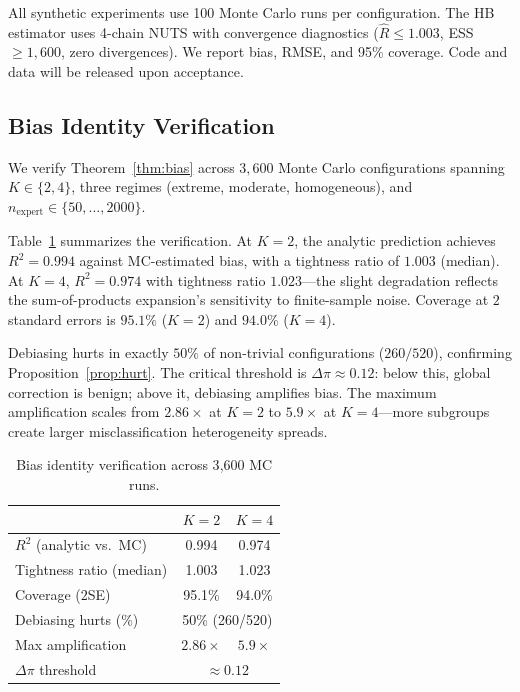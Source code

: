 \documentclass[11pt,twocolumn]{article}
\theoremstyle{remark}
\begin{document}
All synthetic experiments use 100 Monte Carlo runs per configuration.
The HB estimator uses 4-chain NUTS with convergence diagnostics ($\hat{R} \leq 1.003$, ESS $\geq 1{,}600$, zero divergences).
We report bias, RMSE, and 95\% coverage.
Code and data will be released upon acceptance.

\subsection{Bias Identity Verification}\label{sec:bias_verify}

We verify Theorem~\ref{thm:bias} across $3{,}600$ Monte Carlo configurations spanning $K \in \{2,4\}$, three regimes (extreme, moderate, homogeneous), and $n_{\mathrm{expert}} \in \{50, \ldots, 2000\}$.

Table~\ref{tab:bias_identity} summarizes the verification.
At $K{=}2$, the analytic prediction achieves $R^2 = 0.994$ against MC-estimated bias, with a tightness ratio of $1.003$ (median).
At $K{=}4$, $R^2 = 0.974$ with tightness ratio $1.023$---the slight degradation reflects the sum-of-products expansion's sensitivity to finite-sample noise.
Coverage at $2$ standard errors is $95.1\%$ ($K{=}2$) and $94.0\%$ ($K{=}4$).

Debiasing hurts in exactly $50\%$ of non-trivial configurations ($260/520$), confirming Proposition~\ref{prop:hurt}.
The critical threshold is $\Delta\pi \approx 0.12$: below this, global correction is benign; above it, debiasing amplifies bias.
The maximum amplification scales from $2.86\times$ at $K{=}2$ to $5.9\times$ at $K{=}4$---more subgroups create larger misclassification heterogeneity spreads.

\begin{table}[t]
\centering
\small
\caption{Bias identity verification across 3{,}600 MC runs.}
\label{tab:bias_identity}
\begin{tabular}{lcc}
\toprule
& $K{=}2$ & $K{=}4$ \\
\midrule
$R^2$ (analytic vs.\ MC) & 0.994 & 0.974 \\
Tightness ratio (median) & 1.003 & 1.023 \\
Coverage ($2$SE) & 95.1\% & 94.0\% \\
Debiasing hurts (\%) & \multicolumn{2}{c}{50\% (260/520)} \\
Max amplification & $2.86\times$ & $5.9\times$ \\
$\Delta\pi$ threshold & \multicolumn{2}{c}{$\approx 0.12$} \\
\bottomrule
\end{tabular}
\end{table}
\end{document}
